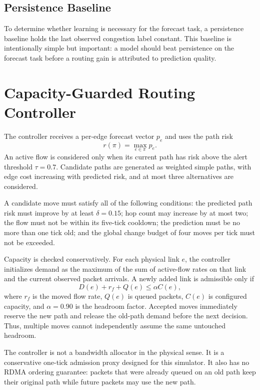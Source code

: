 \documentclass[conference]{IEEEtran}
\begin{document}
\subsection{Persistence Baseline}
To determine whether learning is necessary for the forecast task, a persistence baseline holds the last observed congestion label constant. This baseline is intentionally simple but important: a model should beat persistence on the forecast task before a routing gain is attributed to prediction quality.

\section{Capacity-Guarded Routing Controller}
The controller receives a per-edge forecast vector $p_e$ and uses the path risk
\begin{equation}
r(\pi)=\max_{e\in\pi}p_e.
\end{equation}
An active flow is considered only when its current path has risk above the alert threshold $\tau=0.7$. Candidate paths are generated as weighted simple paths, with edge cost increasing with predicted risk, and at most three alternatives are considered.

A candidate move must satisfy all of the following conditions: the predicted path risk must improve by at least $\delta=0.15$; hop count may increase by at most two; the flow must not be within its five-tick cooldown; the prediction must be no more than one tick old; and the global change budget of four moves per tick must not be exceeded.

Capacity is checked conservatively. For each physical link $e$, the controller initializes demand as the maximum of the sum of active-flow rates on that link and the current observed packet arrivals. A newly added link is admissible only if
\begin{equation}
D(e)+r_f+Q(e)\leq\alpha C(e),
\end{equation}
where $r_f$ is the moved flow rate, $Q(e)$ is queued packets, $C(e)$ is configured capacity, and $\alpha=0.90$ is the headroom factor. Accepted moves immediately reserve the new path and release the old-path demand before the next decision. Thus, multiple moves cannot independently assume the same untouched headroom.

The controller is not a bandwidth allocator in the physical sense. It is a conservative one-tick admission proxy designed for this simulator. It also has no RDMA ordering guarantee: packets that were already queued on an old path keep their original path while future packets may use the new path.
\end{document}
